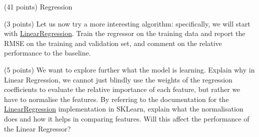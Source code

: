 \documentclass[12pt]{article}
\begin{document}
\begin{question}{\label{Q_LR_BA}(41 points) Regression}
\begin{subquestion}
\end{subquestion}

\begin{subquestion}{(3 points) Let us now try a more interesting algorithm: specifically, we will start with \href{https://scikit-learn.org/stable/modules/generated/sklearn.linear_model.LinearRegression.html}{LinearRegression}. Train the regressor on the training data and report the RMSE on the training and validation set, and comment on the relative performance to the baseline.}






\end{subquestion}



\begin{subquestion}{(5 points) We want to explore further what the model is learning. Explain why in Linear Regression, we cannot just blindly use the weights of the regression coefficients to evaluate the relative importance of each feature, but rather we have to normalise the features. By referring to the documentation for the \href{http://scikit-learn.org/stable/modules/generated/sklearn.linear_model.LinearRegression.html}{LinearRegression} implementation in SKLearn, explain what the normalisation does and how it helps in comparing features. Will this affect the performance of the Linear Regressor?}







\end{subquestion}
\end{question}
\end{document}
